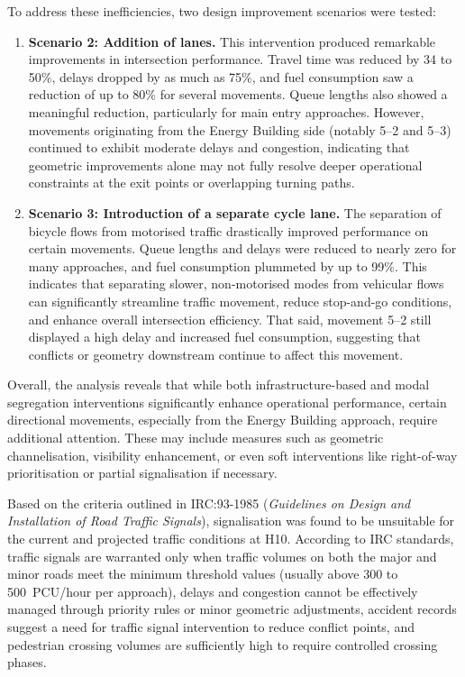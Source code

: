 \documentclass[11pt]{article}
\begin{document}
To address these inefficiencies, two design improvement scenarios were tested:
\begin{enumerate}
  \item \textbf{Scenario 2: Addition of lanes.} This intervention produced remarkable improvements in
  intersection performance. Travel time was reduced by 34 to 50\%, delays dropped by as much as 75\%,
  and fuel consumption saw a reduction of up to 80\% for several movements. Queue lengths also showed a
  meaningful reduction, particularly for main entry approaches. However, movements originating from the
  Energy Building side (notably 5--2 and 5--3) continued to exhibit moderate delays and congestion,
  indicating that geometric improvements alone may not fully resolve deeper operational constraints at
  the exit points or overlapping turning paths.
  \item \textbf{Scenario 3: Introduction of a separate cycle lane.} The separation of bicycle flows from
  motorised traffic drastically improved performance on certain movements. Queue lengths and delays were
  reduced to nearly zero for many approaches, and fuel consumption plummeted by up to 99\%. This
  indicates that separating slower, non-motorised modes from vehicular flows can significantly
  streamline traffic movement, reduce stop-and-go conditions, and enhance overall intersection
  efficiency. That said, movement 5--2 still displayed a high delay and increased fuel consumption,
  suggesting that conflicts or geometry downstream continue to affect this movement.
\end{enumerate}

Overall, the analysis reveals that while both infrastructure-based and modal segregation interventions
significantly enhance operational performance, certain directional movements, especially from the
Energy Building approach, require additional attention. These may include measures such as geometric
channelisation, visibility enhancement, or even soft interventions like right-of-way prioritisation or
partial signalisation if necessary.

Based on the criteria outlined in IRC:93-1985 (\textit{Guidelines on Design and Installation of Road
Traffic Signals}), signalisation was found to be unsuitable for the current and projected traffic
conditions at H10. According to IRC standards, traffic signals are warranted only when traffic volumes
on both the major and minor roads meet the minimum threshold values (usually above 300 to 500~PCU/hour
per approach), delays and congestion cannot be effectively managed through priority rules or minor
geometric adjustments, accident records suggest a need for traffic signal intervention to reduce
conflict points, and pedestrian crossing volumes are sufficiently high to require controlled crossing
phases.
\end{document}
